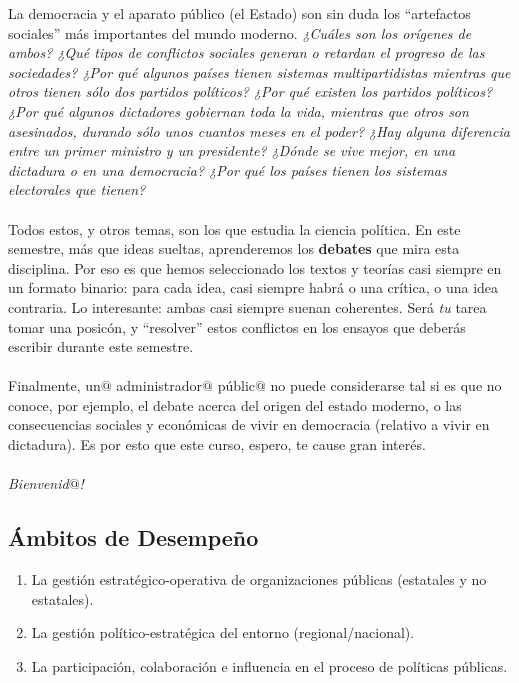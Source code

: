 \documentclass[letterpaper]{article}
\begin{document}
La democracia y el aparato p\'ublico (el Estado) son sin duda los ``artefactos sociales'' m\'as importantes del mundo moderno. \emph{¿Cu\'ales son los or\'igenes de ambos? ¿Qu\'e tipos de conflictos sociales generan o retardan el progreso de las sociedades? ¿Por qu\'e algunos pa\'ises tienen sistemas multipartidistas mientras que otros tienen s\'olo dos partidos pol\'iticos? ¿Por qu\'e existen los partidos pol\'iticos? ¿Por qu\'e algunos dictadores gobiernan toda la vida, mientras que otros son asesinados, durando s\'olo unos cuantos meses en el poder? ¿Hay alguna diferencia entre un primer ministro y un presidente? ¿D\'onde se vive mejor, en una dictadura o en una democracia? ¿Por qu\'e los pa\'ises tienen los sistemas electorales que tienen?} 
\\
\\
Todos estos, y otros temas, son los que estudia la ciencia pol\'itica. En este semestre, m\'as que ideas sueltas, aprenderemos los {\bf debates} que mira esta disciplina. Por eso es que hemos seleccionado los textos y teor\'ias casi siempre en un formato binario: para cada idea, casi siempre habr\'a o una cr\'itica, o una idea contraria. Lo interesante: ambas casi siempre suenan coherentes. Ser\'a \emph{tu} tarea tomar una posic\'on, y ``resolver'' estos conflictos en los ensayos que deber\'as escribir durante este semestre. 
\\
\\
Finalmente, un$@$ administrador$@$ p\'ublic$@$ no puede considerarse tal si es que no conoce, por ejemplo, el debate acerca del origen del estado moderno, o las consecuencias sociales y econ\'omicas de vivir en democracia (relativo a vivir en dictadura). Es por esto que este curso, espero, te cause gran inter\'es.
\\
\\
\emph{Bienvenid$@$!}


\subsection*{\'Ambitos de Desempe\~no}

\begin{enumerate}
  \item La gesti\'on estrat\'egico-operativa de organizaciones p\'ublicas (estatales y no estatales).
  \item La gesti\'on pol\'itico-estrat\'egica del entorno (regional/nacional).
  \item La participaci\'on, colaboraci\'on e influencia en el proceso de pol\'iticas p\'ublicas.
\end{enumerate}
\end{document}
